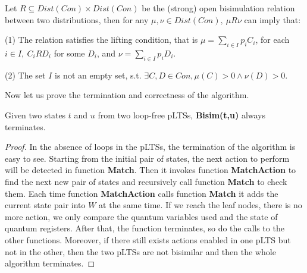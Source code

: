 \documentclass[a4paper,UKenglish,cleveref, autoref]{lipics-v2019}
\begin{document}
\begin{definition}

Let $\textit{R}\subseteq Dist(Con)\times Dist(Con)$ be the (strong) open bisimulation relation between two distributions, then for any $\mu,\nu\in Dist(Con),\ \mu\textit{R}\nu$ can imply that:
\begin{item}
\item[(1)] The relation satisfies the lifting condition, that is $\mu=\sum_{i\in I}p_i\textit{C}_i$, for each $i\in I,\ \textit{C}_i\textit{R}\textit{D}_i$ for some $\textit{D}_i$, and $\nu=\sum_{i\in I}p_i\textit{D}_i$.
\item[(2)] The set $I$ is not an empty set, s.t. $\exists C,D\in Con, \mu(C)>0\wedge\nu(D)>0$.
\end{item}
\end{definition}

Now let us prove the termination and correctness of the algorithm. 


\begin{theorem}[Termination]

Given two states $t$ and $u$ from two loop-free pLTSs, \textbf{Bisim(t,u)} always terminates.
\end{theorem} 
\begin{proof}
In the absence of loops in the pLTSs, the termination of the algorithm is easy to see.
Starting from the initial pair of states, the next action to perform will be detected in function \textbf{Match}. Then it invokes function \textbf{MatchAction} to find the next new pair of states and recursively call function \textbf{Match} to check them. Each time function \textbf{MatchAction} calls function \textbf{Match} it adds the current state pair into $W$ at the same time. If we reach the leaf nodes, there is no more action, we only compare the quantum variables used and the state of quantum registers. After that, the function terminates, so do the calls to the other functions. Moreover, if there still exists actions enabled in one pLTS but not in the other, then the two pLTSs are not bisimilar and then the whole algorithm terminates. 
\end{proof}
\end{document}
